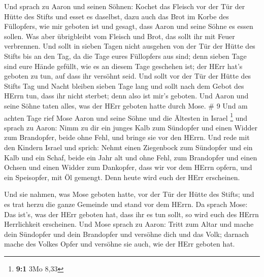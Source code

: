 Und sprach zu Aaron und seinen Söhnen: Kochet das Fleisch
vor der Tür der Hütte des Stifts und esset es daselbst, dazu auch das
Brot im Korbe des Füllopfers, wie mir geboten ist und gesagt, dass Aaron
und seine Söhne es essen sollen.  Was aber übrigbleibt vom
Fleisch und Brot, das sollt ihr mit Feuer verbrennen.  Und
sollt in sieben Tagen nicht ausgehen von der Tür der Hütte des Stifts
bis an den Tag, da die Tage eures Füllopfers aus sind; denn sieben Tage
sind eure Hände gefüllt,  wie es an diesem Tage geschehen
ist; der HErr hat's geboten zu tun, auf dass ihr versöhnt seid.
 Und sollt vor der Tür der Hütte des Stifts Tag und Nacht
bleiben sieben Tage lang und sollt nach dem Gebot des HErrn tun, dass
ihr nicht sterbet; denn also ist mir's geboten.  Und Aaron
und seine Söhne taten alles, was der HErr geboten hatte durch Mose. \# 9
 Und am achten Tage rief Mose Aaron und seine Söhne und die
Ältesten in Israel \footnote{\textbf{9:1} 3Mo 8,33}  und
sprach zu Aaron: Nimm zu dir ein junges Kalb zum Sündopfer und einen
Widder zum Brandopfer, beide ohne Fehl, und bringe sie vor den HErrn.
 Und rede mit den Kindern Israel und sprich: Nehmt einen
Ziegenbock zum Sündopfer und ein Kalb und ein Schaf, beide ein Jahr alt
und ohne Fehl, zum Brandopfer  und einen Ochsen und einen
Widder zum Dankopfer, dass wir vor dem HErrn opfern, und ein Speisopfer,
mit Öl gemengt. Denn heute wird euch der HErr erscheinen.

 Und sie nahmen, was Mose geboten hatte, vor der Tür der
Hütte des Stifts; und es trat herzu die ganze Gemeinde und stand vor dem
HErrn.  Da sprach Mose: Das ist's, was der HErr geboten hat,
dass ihr es tun sollt, so wird euch des HErrn Herrlichkeit erscheinen.
 Und Mose sprach zu Aaron: Tritt zum Altar und mache dein
Sündopfer und dein Brandopfer und versöhne dich und das Volk; darnach
mache des Volkes Opfer und versöhne sie auch, wie der HErr geboten hat.

